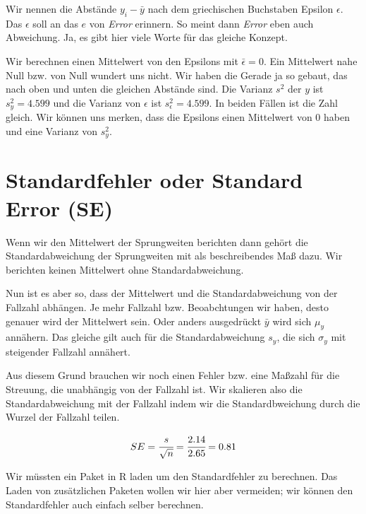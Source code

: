 \documentclass[
  letterpaper,
  DIV=11,
  oneside]{scrreport}
\begin{document}
Wir nennen die Abstände \(y_i - \bar{y}\) nach dem griechischen
Buchstaben Epsilon \(\epsilon\). Das \(\epsilon\) soll an das \(e\) von
\emph{Error} erinnern. So meint dann \emph{Error} eben auch Abweichung.
Ja, es gibt hier viele Worte für das gleiche Konzept.

Wir berechnen einen Mittelwert von den Epsilons mit
\(\bar{\epsilon} = 0\). Ein Mittelwert nahe Null bzw. von Null wundert
uns nicht. Wir haben die Gerade ja so gebaut, das nach oben und unten
die gleichen Abstände sind. Die Varianz \(s^2\) der \(y\) ist
\(s_y^2 = 4.599\) und die Varianz von \(\epsilon\) ist
\(s_{\epsilon}^2 = 4.599\). In beiden Fällen ist die Zahl gleich. Wir
können uns merken, dass die Epsilons einen Mittelwert von 0 haben und
eine Varianz von \(s_y^2\).

{}

\hypertarget{standardfehler-oder-standard-error-se}{%
\section{Standardfehler oder Standard Error
(SE)}\label{standardfehler-oder-standard-error-se}}

Wenn wir den Mittelwert der Sprungweiten berichten dann gehört die
Standardabweichung der Sprungweiten mit als beschreibendes Maß dazu. Wir
berichten keinen Mittelwert ohne Standardabweichung.

Nun ist es aber so, dass der Mittelwert und die Standardabweichung von
der Fallzahl abhängen. Je mehr Fallzahl bzw. Beoabchtungen wir haben,
desto genauer wird der Mittelwert sein. Oder anders ausgedrückt
\(\bar{y}\) wird sich \(\mu_y\) annähern. Das gleiche gilt auch für die
Standardabweichung \(s_y\), die sich \(\sigma_y\) mit steigender
Fallzahl annähert.

Aus diesem Grund brauchen wir noch einen Fehler bzw. eine Maßzahl für
die Streuung, die unabhängig von der Fallzahl ist. Wir skalieren also
die Standardabweichung mit der Fallzahl indem wir die Standardbweichung
durch die Wurzel der Fallzahl teilen.

\[
SE = \cfrac{s}{\sqrt{n}} = \cfrac{2.14}{2.65} = 0.81
\]

Wir müssten ein Paket in R laden um den Standardfehler zu berechnen. Das
Laden von zusätzlichen Paketen wollen wir hier aber vermeiden; wir
können den Standardfehler auch einfach selber berechnen.
\end{document}
